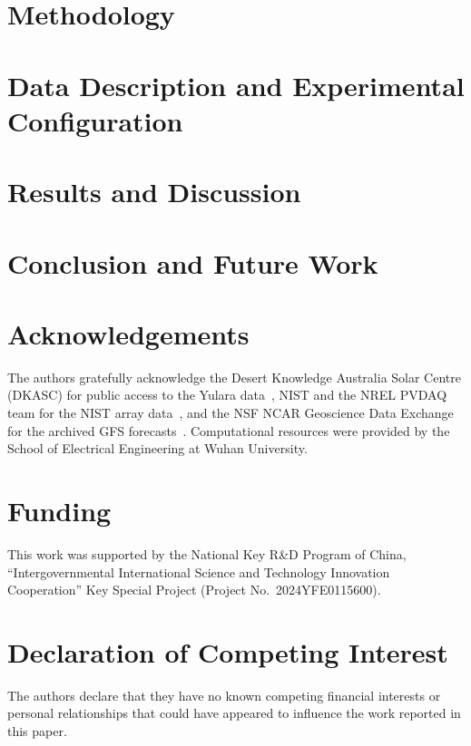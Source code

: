 \documentclass[preprint,12pt]{elsarticle}
\begin{document}
\section{Methodology}
\label{sec:methodology}

\FloatBarrier

\section{Data Description and Experimental Configuration}
\label{sec:setup}

\FloatBarrier

\section{Results and Discussion}
\label{sec:results}

\FloatBarrier

\section{Conclusion and Future Work}
\label{sec:conclusion}

\FloatBarrier

\section*{Acknowledgements}
The authors gratefully acknowledge the Desert Knowledge Australia Solar Centre (DKASC) for public
access to the Yulara data~\cite{dkasc_yulara}, NIST and the NREL PVDAQ team for the NIST array
data~\cite{boyd2017nist,deline2021pvdaq}, and the NSF NCAR Geoscience Data Exchange for the
archived GFS forecasts~\cite{ncep2015gfs}.
Computational resources were provided by the School of Electrical
Engineering at Wuhan University.

\section*{Funding}
This work was supported by the National Key R\&D Program of China,
``Intergovernmental International Science and Technology Innovation
Cooperation'' Key Special Project (Project No.\ 2024YFE0115600).

\section*{Declaration of Competing Interest}
The authors declare that they have no known competing financial
interests or personal relationships that could have appeared to
influence the work reported in this paper.
\end{document}
